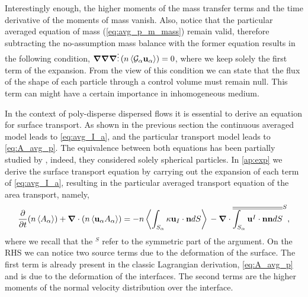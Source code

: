 Interestingly enough, the higher moments of the mass transfer terms and the time derivative of the moments of mass vanish. 
Also, notice that the particular averaged equation of mass (\ref{eq:avg_p_m_mass}) remain valid, therefore subtracting the no-assumption mass balance with the former equation results in the following condition, $\bm{\nabla}\bm{\nabla}\bm{\nabla} \vdots \left(n \left< \mathcal{G}_\alpha\textbf{u}_\alpha\right>\right) = 0$, where we keep solely the first term of the expansion. 
From the view of this condition we can state that the flux of the shape of each particle through a control volume must remain null. 
This term can might have a certain importance in inhomogeneous medium. 

In the context of poly-disperse dispersed flows it is essential to derive an equation for surface transport. 
As shown in the previous section the continuous averaged model leads to \ref{eq:avg_I_a}, and the particular transport model leads to \ref{eq:A_avg_p}. 
The equivalence between both equations has been partially studied by \citep{lhuillier2000bilan}, indeed, they considered solely spherical particles. 
In \ref{ap:exp} we derive the surface transport equation by carrying out the expansion of each term of \ref{eq:avg_I_a}, resulting in the particular averaged transport equation of the area transport, namely, 
\begin{equation}
    \frac{\partial}{\partial t} (n \left<A_\alpha\right>)
    + \bm{\nabla} \cdot (n \left<\textbf{u}_\alpha A_\alpha\right>)
    = -n \left<\int_{S_\alpha} \kappa\textbf{u}_I\cdot \textbf{n} dS \right>\\
    - \bm{\nabla} \cdot \overline{\overline{\int_{S_\alpha} \textbf{u}^I \cdot\textbf{nn} dS}}^S,
    \label{eq:hybrid_area}
\end{equation}
where we recall that the $^S$ refer to the symmetric part of the argument. 
On the RHS we can notice two source terms due to the deformation of the surface. 
The first term is already present in the classic Lagrangian derivation, \ref{eq:A_avg_p} and is due to the deformation of the interfaces. 
The second  terms are the higher moments of the normal velocity distribution over the interface. 

